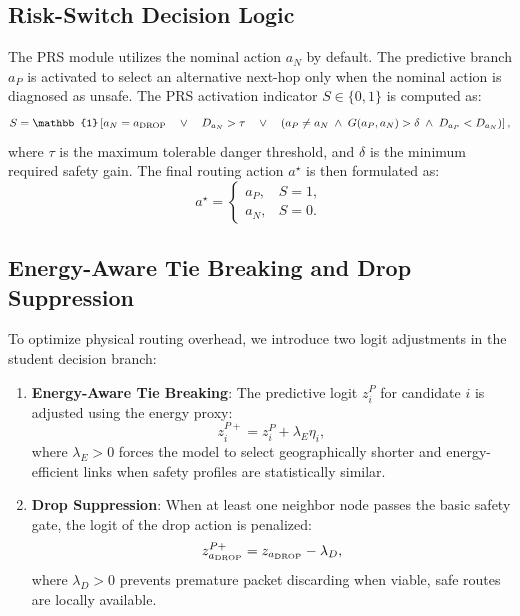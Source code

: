 \subsection{Risk-Switch Decision Logic}
The PRS module utilizes the nominal action $a_N$ by default. The predictive branch $a_P$ is activated to select an alternative next-hop only when the nominal action is diagnosed as unsafe. The PRS activation indicator $S \in \{0, 1\}$ is computed as:
\begin{equation}
    S = \mathbb{1}\left[ a_N = \dropact \quad \lor \quad D_{a_N} > \tau \quad \lor \quad \left( a_P \neq a_N \; \land \; G(a_P, a_N) > \delta \; \land \; D_{a_P} < D_{a_N} \right) \right],
\end{equation}
where $\tau$ is the maximum tolerable danger threshold, and $\delta$ is the minimum required safety gain. The final routing action $a^\star$ is then formulated as:
\begin{equation}
    a^\star = \begin{cases} a_P, & S = 1, \\ a_N, & S = 0. \end{cases}
\end{equation}

\subsection{Energy-Aware Tie Breaking and Drop Suppression}
To optimize physical routing overhead, we introduce two logit adjustments in the student decision branch:
\begin{enumerate}
    \item \textbf{Energy-Aware Tie Breaking}: The predictive logit $z_i^P$ for candidate $i$ is adjusted using the energy proxy:
    \begin{equation}
        z_i^{P+} = z_i^P + \lambda_E \eta_i,
    \end{equation}
    where $\lambda_E > 0$ forces the model to select geographically shorter and energy-efficient links when safety profiles are statistically similar.
    \item \textbf{Drop Suppression}: When at least one neighbor node passes the basic safety gate, the logit of the drop action is penalized:
    \begin{equation}
        z_{a_{\mathrm{DROP}}}^{P+} = z_{a_{\mathrm{DROP}}} - \lambda_D,
    \end{equation}
    where $\lambda_D > 0$ prevents premature packet discarding when viable, safe routes are locally available.
\end{enumerate}


